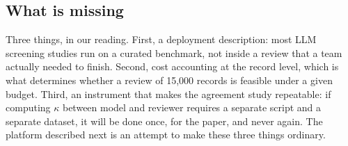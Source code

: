\subsection{What is missing}

Three things, in our reading. First, a deployment description: most LLM
screening studies run on a curated benchmark, not inside a review that a team
actually needed to finish. Second, cost accounting at the record level, which
is what determines whether a review of 15{,}000 records is feasible under a
given budget. Third, an instrument that makes the agreement study repeatable:
if computing $\kappa$ between model and reviewer requires a separate script and
a separate dataset, it will be done once, for the paper, and never again. The
platform described next is an attempt to make these three things ordinary.
